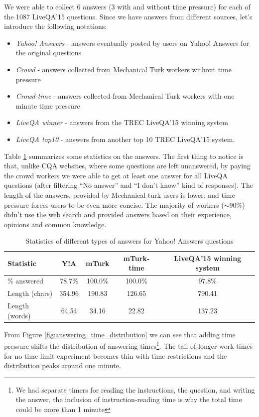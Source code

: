 We were able to collect 6 answers (3 with and without time pressure) for each of the 1087 LiveQA'15 questions.
Since we have answers from different sources, let's introduce the following notations:
\begin{itemize}
\setlength{\itemsep}{0pt}
\setlength{\parskip}{0pt}
	\item \textit{Yahoo! Answers} - answers eventually posted by users on Yahoo! Answers for the original questions
	\item \textit{Crowd} - answers collected from Mechanical Turk workers without time pressure
	\item \textit{Crowd-time} - answers collected from Mechanical Turk workers with one minute time pressure
	\item \textit{LiveQA winner} - answers from the TREC LiveQA'15 winning system
	\item \textit{LiveQA top10} - answers from another top 10 TREC LiveQA'15 system.
\end{itemize}

Table \ref{table:answer_stats} summarizes some statistics on the answers.
The first thing to notice is that, unlike CQA websites, where some questions are left unanswered, by paying the crowd workers we were able to get at least one answer for all LiveQA questions (after filtering ``No answer'' and ``I don't know'' kind of responses).
The length of the answers, provided by Mechanical turk users is lower, and time pressure forces users to be even more concise.
The majority of workers ($\sim90 \%$) didn't use the web search and provided answers based on their experience, opinions and common knowledge.

\begin{table}[ht]
\centering
\caption{Statistics of different types of answers for Yahoo! Answers questions}
\begin{tabular}{| p{3cm} | c | c | c | c |}
\hline
Statistic & Y!A & mTurk & mTurk-time & LiveQA'15 winning system\\
\hline
\% answered & 78.7\% & 100.0\% & 100.0\% & 97.8\% \\
Length (chars) & 354.96 & 190.83 & 126.65 & 790.41 \\
Length (words) & 64.54 & 34.16 & 22.82 & 137.23 \\
\hline
\end{tabular}
\label{table:answer_stats}
\vspace{-0.3cm}
\end{table}

From Figure \ref{fig:answering_time_distribution} we can see that adding time pressure shifts the distribution of answering times\footnote{We had separate timers for reading the instructions, the question, and writing the answer, the inclusion of instruction-reading time is why the total time could be more than 1 minute}.
The tail of longer work times for no time limit experiment becomes thin with time restrictions and the distribution peaks around one minute.

